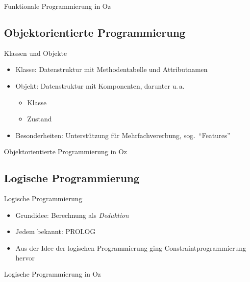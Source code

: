 \begin{frame}{Funktionale Programmierung in Oz}
  
  \href{run:oz-funktional2.oz}{} 
\end{frame}

\subsection{Objektorientierte Programmierung}
\begin{frame}{Klassen und Objekte}
  \begin{itemize}
    \item Klasse: Datenstruktur mit Methodentabelle und Attributnamen
    \item Objekt: Datenstruktur mit Komponenten, darunter u.\,a.\:
	  \begin{itemize}
        \item Klasse
        \item Zustand
      \end{itemize}
        \item Besonderheiten: Unterstützung für Mehrfachvererbung, sog.\ 
        "`Features"'
  \end{itemize}
\end{frame}

\begin{frame}{Objektorientierte Programmierung in Oz}
  
  \href{run:oz-oop.oz}{} 
\end{frame}

\subsection{Logische Programmierung}
\begin{frame}{Logische Programmierung}
  \begin{itemize}
    \item Grundidee: Berechnung als \textsl{Deduktion}
    \item Jedem bekannt: PROLOG
    \item Aus der Idee der logischen Programmierung ging 
    Constraintprogrammierung hervor
  \end{itemize}
\end{frame}

\begin{frame}{Logische Programmierung in Oz}
  
  \href{run:oz-logisch.oz}{} 
\end{frame}
